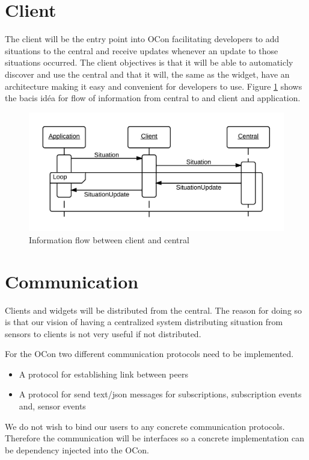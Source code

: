 \documentclass[../report.tex]{subfiles}
\begin{document}
\section{Client}

The client will be the entry point into OCon facilitating developers to add situations to the central and receive updates whenever an update to those situations occurred. The client objectives is that it will be able to automaticly discover and use the central and that it will, the same as the widget, have an architecture making it easy and convenient for developers to use. Figure \ref{seqclient} shows the bacis idéa for flow of information from central to and client and application.


\begin{figure}[h]
\centering
\includegraphics[width=\linewidth]{clientsequencediagram.png}
\caption{Information flow between client and central}
\label{seqclient}
\end{figure}


\section{Communication}

Clients and widgets will be distributed from the central. The reason for doing so is that our vision of having a centralized system distributing situation from sensors to clients is not very useful if not distributed.

For the OCon two different communication protocols need to be implemented.\\

\begin{itemize}
    \item A protocol for establishing link between peers
    \item A protocol for send text/json messages for subscriptions, subscription events and, sensor events \\
\end{itemize}

We do not wish to bind our users to any concrete communication protocols. Therefore the communication will be interfaces so a concrete implementation can be dependency injected into the OCon.
\end{document}
